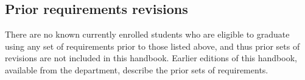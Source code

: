 \documentclass[10pt,letter,twocolumn]{book}
\begin{document}
\subsection{Prior requirements revisions}

There are no known currently enrolled students who are eligible to graduate
using any set of requirements prior to those listed above, and thus
prior sets of revisions are not included in this handbook.  Earlier
editions of this handbook, available from the department, describe
the prior sets of requirements.




%
\end{document}
